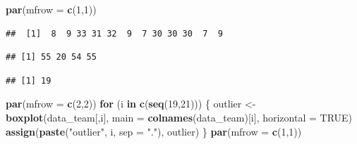 \documentclass[
]{article}
\newenvironment{Shaded}{\begin{snugshade}}{\end{snugshade}}
\newcommand{\CommentTok}[1]{\textcolor[rgb]{0.56,0.35,0.01}{\textit{#1}}}
\newcommand{\ControlFlowTok}[1]{\textcolor[rgb]{0.13,0.29,0.53}{\textbf{#1}}}
\newcommand{\DataTypeTok}[1]{\textcolor[rgb]{0.13,0.29,0.53}{#1}}
\newcommand{\DecValTok}[1]{\textcolor[rgb]{0.00,0.00,0.81}{#1}}
\newcommand{\FloatTok}[1]{\textcolor[rgb]{0.00,0.00,0.81}{#1}}
\newcommand{\KeywordTok}[1]{\textcolor[rgb]{0.13,0.29,0.53}{\textbf{#1}}}
\newcommand{\NormalTok}[1]{#1}
\newcommand{\OperatorTok}[1]{\textcolor[rgb]{0.81,0.36,0.00}{\textbf{#1}}}
\newcommand{\OtherTok}[1]{\textcolor[rgb]{0.56,0.35,0.01}{#1}}
\newcommand{\StringTok}[1]{\textcolor[rgb]{0.31,0.60,0.02}{#1}}
\begin{document}
\begin{Shaded}
\begin{Highlighting}[]
\KeywordTok{par}\NormalTok{(}\DataTypeTok{mfrow =} \KeywordTok{c}\NormalTok{(}\DecValTok{1}\NormalTok{,}\DecValTok{1}\NormalTok{))}
\end{Highlighting}
\end{Shaded}

\begin{Shaded}
\end{Shaded}

\begin{verbatim}
##  [1]  8  9 33 31 32  9  7 30 30 30  7  9
\end{verbatim}

\begin{Shaded}
\end{Shaded}

\begin{verbatim}
## [1] 55 20 54 55
\end{verbatim}

\begin{Shaded}
\end{Shaded}

\begin{verbatim}
## [1] 19
\end{verbatim}

\newpage

\begin{Shaded}
\begin{Highlighting}[]
\KeywordTok{par}\NormalTok{(}\DataTypeTok{mfrow =} \KeywordTok{c}\NormalTok{(}\DecValTok{2}\NormalTok{,}\DecValTok{2}\NormalTok{))}
\ControlFlowTok{for}\NormalTok{ (i }\ControlFlowTok{in} \KeywordTok{c}\NormalTok{(}\KeywordTok{seq}\NormalTok{(}\DecValTok{19}\NormalTok{,}\DecValTok{21}\NormalTok{))) \{}
\NormalTok{  outlier <-}\StringTok{ }\KeywordTok{boxplot}\NormalTok{(data_team[,i], }\DataTypeTok{main =} \KeywordTok{colnames}\NormalTok{(data_team)[i], }\DataTypeTok{horizontal =} \OtherTok{TRUE}\NormalTok{)}
  \KeywordTok{assign}\NormalTok{(}\KeywordTok{paste}\NormalTok{(}\StringTok{"outlier"}\NormalTok{, i, }\DataTypeTok{sep =} \StringTok{"."}\NormalTok{), outlier)}
\NormalTok{\}}
\KeywordTok{par}\NormalTok{(}\DataTypeTok{mfrow =} \KeywordTok{c}\NormalTok{(}\DecValTok{1}\NormalTok{,}\DecValTok{1}\NormalTok{))}
\end{Highlighting}
\end{Shaded}
\end{document}
